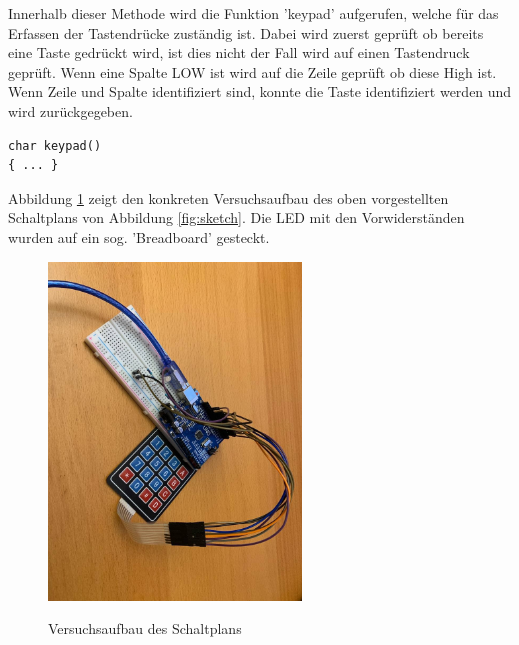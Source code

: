 Innerhalb dieser Methode wird die Funktion 'keypad' aufgerufen, welche für das Erfassen der Tastendrücke zuständig ist. Dabei wird zuerst geprüft ob bereits eine Taste gedrückt wird, ist dies nicht der Fall wird auf einen Tastendruck geprüft. Wenn eine Spalte LOW ist wird auf die Zeile geprüft ob diese High ist. Wenn Zeile und Spalte identifiziert sind, konnte die Taste identifiziert werden und wird zurückgegeben.

\begin{lstlisting}[style=CStyle]
char keypad()
{ ... }
\end{lstlisting}

\noindent Abbildung \ref{fig:pic} zeigt den konkreten Versuchsaufbau des oben vorgestellten Schaltplans von Abbildung \ref{fig:sketch}. Die LED mit den Vorwiderständen wurden auf ein sog. 'Breadboard' gesteckt.

\begin{figure}[H]
    \caption{Versuchsaufbau des Schaltplans}
    \centering
    \includegraphics[width=0.6\textwidth]{images/picture.jpg}
    \label{fig:pic}
\end{figure}